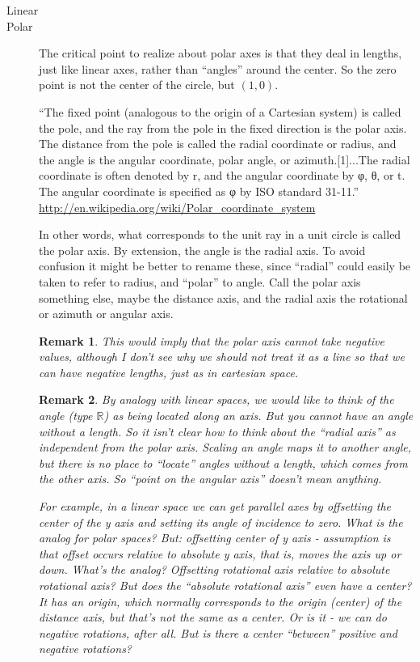 \documentclass[12pt]{tufte-handout}
\numberwithin{equation}{subsection}
\numberwithin{equation}{subsection}
\newtheorem{remark}{Remark}
\newcommand\R{\(\mathds{R}\)}
\begin{document}
  \begin{description}
  \item [Linear]
  \item [Polar]

    The critical point to realize about polar axes is that they deal
    in lengths, just like linear axes, rather than ``angles'' around
    the center.  So the zero point is not the center of the circle,
    but \((1,0)\).


    ``The fixed point (analogous to the origin of a
    Cartesian system) is called the pole, and the ray from the pole
    in the fixed direction is the polar axis. The distance from the
    pole is called the radial coordinate or radius, and the angle is
    the angular coordinate, polar angle, or azimuth.[1]...The radial
    coordinate is often denoted by r, and the angular coordinate by
    φ, θ, or t. The angular coordinate is specified as φ by ISO
    standard 31-11.''
    \url{http://en.wikipedia.org/wiki/Polar_coordinate_system}

    In other words, what corresponds to the unit ray in a unit
    circle is called the polar axis.  By extension, the angle is the
    radial axis.  To avoid confusion it might be better to rename
    these, since ``radial'' could easily be taken to refer to
    radius, and ``polar'' to angle.  Call the polar axis something
    else, maybe the distance axis, and the radial axis the
    rotational or azimuth or angular axis.

    \begin{remark}
      This would imply that the polar axis cannot take negative
      values, although I don't see why we should not treat it as a
      line so that we can have negative lengths, just as in
      cartesian space.
    \end{remark}


    \begin{remark}
      By analogy with linear spaces, we would like to think of the
      angle (type \R) as being located along an axis.  But you
      cannot have an angle without a length.  So it isn't clear how
      to think about the ``radial axis'' as independent from the
      polar axis.  Scaling an angle maps it to another angle, but
      there is no place to ``locate'' angles without a length, which
      comes from the other axis.  So ``point on the angular axis''
      doesn't mean anything.

      For example, in a linear space we can get parallel axes by
      offsetting the center of the y axis and setting its angle of
      incidence to zero.  What is the analog for polar spaces?  But:
      offsetting center of y axis - assumption is that offset occurs
      relative to absolute y axis, that is, moves the axis up or
      down.  What's the analog?  Offsetting rotational axis relative
      to absolute rotational axis?  But does the ``absolute
      rotational axis'' even have a center?  It has an origin, which
      normally corresponds to the origin (center) of the distance
      axis, but that's not the same as a center.  Or is it - we can
      do negative rotations, after all.  But is there a center
      ``between'' positive and negative rotations?


\end{remark}
\end{description}
\end{document}
